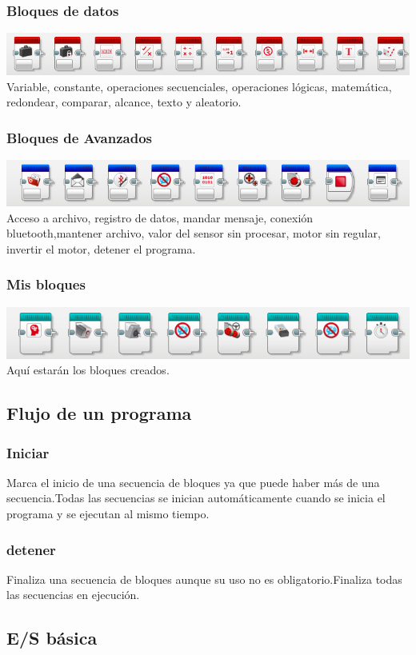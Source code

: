 \documentclass[12pt,a4paper]{article}
\begin{document}
\subsubsection{Bloques de datos}
\includegraphics[scale=0.5]{operaciones.PNG}
Variable, constante, operaciones secuenciales, operaciones lógicas, matemática, redondear, comparar, alcance, texto y aleatorio.
\subsubsection{Bloques de Avanzados}
\includegraphics[scale=0.5]{avanzado.PNG}
Acceso a archivo, registro de datos, mandar mensaje, conexión bluetooth,mantener archivo, valor del sensor sin procesar, motor sin regular, invertir el motor, detener el programa.
\subsubsection{Mis bloques}
\includegraphics[scale=0.5]{BloquesPersonalizados.PNG}
Aquí estarán los bloques creados.
\subsection{Flujo de un programa}
\subsubsection{Iniciar}
Marca el inicio de una secuencia de bloques ya que puede haber más de una secuencia.Todas las secuencias se inician automáticamente cuando se inicia el programa y se ejecutan al mismo tiempo.
\subsubsection{detener}
Finaliza una secuencia de bloques aunque su uso no es obligatorio.Finaliza todas las secuencias en ejecución.
\subsection{E/S básica}
\end{document}
